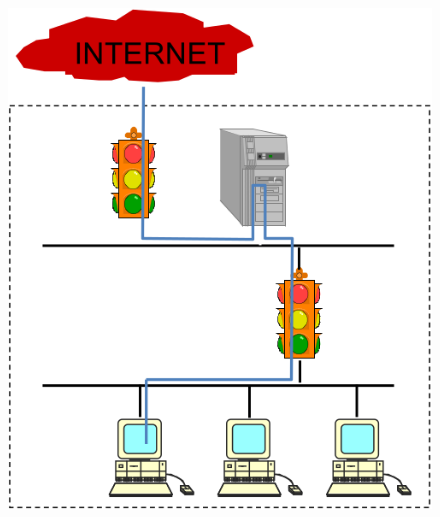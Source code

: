\documentclass[twocolumn,landscape,10pt]{article}
\theoremstyle{definition}
\begin{document}
\begin{itemize}
\begin{figure}[h]
          	\includegraphics[scale=0.25]{subnet.png}
          	\centering
        \end{figure}
\end{itemize} 
\end{document}
